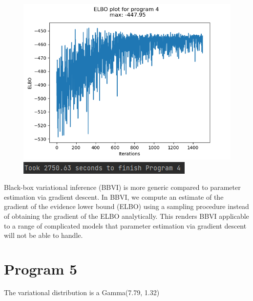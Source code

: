 \documentclass[10pt]{homeworg}
\begin{document}
\begin{figure}[!htbp]
    \centering
    \begin{minipage}{0.45\textwidth}
        \centering
       \includegraphics[scale=0.5]{figures/elbo_program_4.png}
    \end{minipage}\hfill
    \begin{minipage}{0.45\textwidth}
        \centering
        \includegraphics[scale=0.8]{figures/program4_time.png}
    \end{minipage}
\end{figure}

\newpage

Black-box variational inference (BBVI) is more generic compared to parameter estimation via gradient descent. In BBVI, we compute an estimate of the gradient of the evidence lower bound (ELBO) using a sampling procedure instead of obtaining the gradient of the ELBO analytically. This renders BBVI applicable to a range of complicated models that parameter estimation via gradient descent will not be able to handle.


\section*{Program 5}

The variational distribution is a Gamma(7.79, 1.32)
\end{document}
